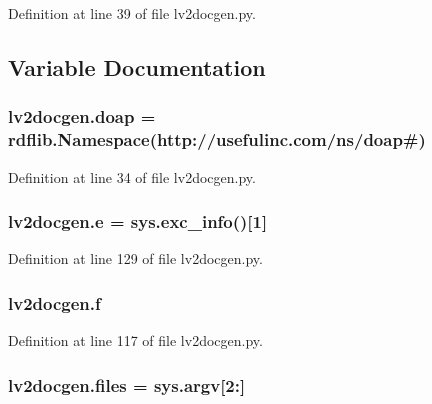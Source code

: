 Definition at line 39 of file lv2docgen.\+py.



\subsection{Variable Documentation}
\subsubsection[{\texorpdfstring{doap}{doap}}]{\setlength{\rightskip}{0pt plus 5cm}lv2docgen.\+doap = rdflib.\+Namespace(\textquotesingle{}http\+://usefulinc.\+com/{\bf ns}/doap\#\textquotesingle{})}\hypertarget{namespacelv2docgen_a087b4f03c6a2406454850630dfa612d3}{}\label{namespacelv2docgen_a087b4f03c6a2406454850630dfa612d3}


Definition at line 34 of file lv2docgen.\+py.

\subsubsection[{\texorpdfstring{e}{e}}]{\setlength{\rightskip}{0pt plus 5cm}lv2docgen.\+e = sys.\+exc\+\_\+info()\mbox{[}1\mbox{]}}\hypertarget{namespacelv2docgen_a4405dc5a2509537b9ff3b4de10bc28d6}{}\label{namespacelv2docgen_a4405dc5a2509537b9ff3b4de10bc28d6}


Definition at line 129 of file lv2docgen.\+py.

\subsubsection[{\texorpdfstring{f}{f}}]{\setlength{\rightskip}{0pt plus 5cm}lv2docgen.\+f}\hypertarget{namespacelv2docgen_a6b416b5176666c9c2ddcfcecf2e40dc3}{}\label{namespacelv2docgen_a6b416b5176666c9c2ddcfcecf2e40dc3}


Definition at line 117 of file lv2docgen.\+py.

\subsubsection[{\texorpdfstring{files}{files}}]{\setlength{\rightskip}{0pt plus 5cm}lv2docgen.\+files = {\bf sys.\+argv}\mbox{[}2\+:\mbox{]}}\hypertarget{namespacelv2docgen_a2be4ec33b98834ddad6dbf8e8779cfb9}{}\label{namespacelv2docgen_a2be4ec33b98834ddad6dbf8e8779cfb9}


